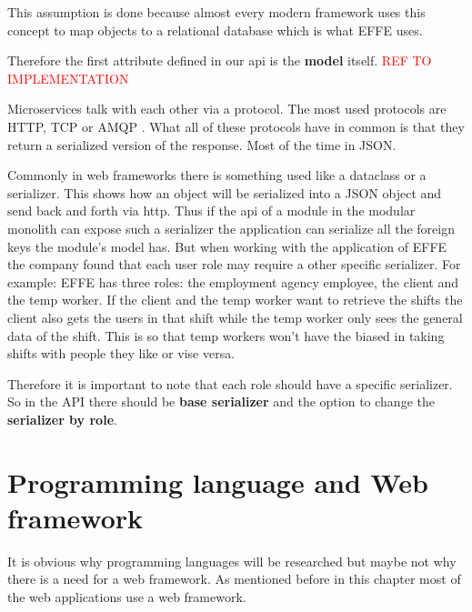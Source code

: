 
This assumption is done because almost every modern framework uses this concept to map objects to a relational database which is what EFFE uses.

Therefore the first attribute defined in our api is the \textbf{model} itself. \textcolor{red}{REF TO IMPLEMENTATION}

Microservices talk with each other via a protocol. The most used protocols are HTTP, TCP or AMQP \cite{microservicesAPI}. What all of these protocols have in common is that they return a serialized version of the response. Most of the time in JSON.

Commonly in web frameworks there is something used like a dataclass or a serializer. This shows how an object will be serialized into a JSON object and send back and forth via http. Thus if the api of a module in the modular monolith can expose such a serializer the application can serialize all the foreign keys the module's model has. But when working with the application of EFFE the company found that each user role may require a other specific serializer. For example: EFFE has three roles: the employment agency employee, the client and the temp worker. If the client and the temp worker want to retrieve the shifts the client also gets the users in that shift while the temp worker only sees the general data of the shift. This is so that temp workers won't have the biased in taking shifts with people they like or vise versa.

Therefore it is important to note that each role should have a specific serializer. So in the API there should be \textbf{base serializer} and the option to change the \textbf{serializer by role}.

\section{Programming language and Web framework}

It is obvious why programming languages will be researched but maybe not why there is a need for a web framework. As mentioned before in this chapter most of the web applications use a web framework. 


